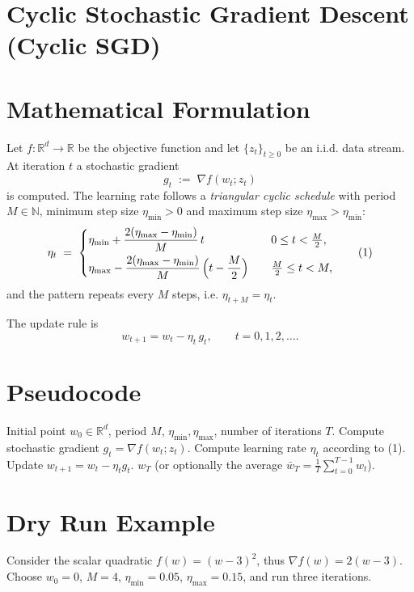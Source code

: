 \documentclass[11pt]{article}
\begin{document}
\section*{Cyclic Stochastic Gradient Descent (Cyclic SGD)}

\section*{Mathematical Formulation}
Let $f:\mathbb{R}^d\rightarrow\mathbb{R}$ be the objective function and let $\{z_t\}_{t\ge 0}$ be an i.i.d. data stream.
At iteration $t$ a stochastic gradient 
\[
g_t\;:=\;\nabla f(w_t;z_t)
\]
is computed.  
The learning rate follows a \emph{triangular cyclic schedule} with period $M\in\mathbb{N}$,
minimum step size $\eta_{\min}>0$ and maximum step size $\eta_{\max}>\eta_{\min}$:
\[
\eta_t \;=\;
\begin{cases}
\displaystyle 
\eta_{\min}+ \frac{2(\eta_{\max}-\eta_{\min})}{M}\,t \quad & 0\le t <\frac{M}{2},\\[6pt]
\displaystyle 
\eta_{\max}- \frac{2(\eta_{\max}-\eta_{\min})}{M}\,\Bigl(t-\frac{M}{2}\Bigr) \quad & \frac{M}{2}\le t < M,
\end{cases}
\tag{1}
\]
and the pattern repeats every $M$ steps, i.e. $\eta_{t+M}=\eta_t$.

The update rule is
\[
w_{t+1}=w_t-\eta_t\,g_t,\qquad t=0,1,2,\dots .
\tag{2}
\]

\section*{Pseudocode}
\begin{algorithm}[H]
\caption{Cyclic SGD}
\begin{algorithmic}[1]
\REQUIRE Initial point $w_0\in\mathbb{R}^d$, period $M$, $\eta_{\min},\eta_{\max}$, number of iterations $T$.
    \STATE Compute stochastic gradient $g_t=\nabla f(w_t;z_t)$.
    \STATE Compute learning rate $\eta_t$ according to (1).
    \STATE Update $w_{t+1}=w_t-\eta_t g_t$.
\ENDFOR
\RETURN $w_T$ (or optionally the average $\bar w_T=\frac1T\sum_{t=0}^{T-1}w_t$).
\end{algorithmic}
\end{algorithm}

\section*{Dry Run Example}
Consider the scalar quadratic $f(w)=(w-3)^2$, thus $\nabla f(w)=2(w-3)$.
Choose $w_0=0$, $M=4$, $\eta_{\min}=0.05$, $\eta_{\max}=0.15$, and run three iterations.
\end{document}
